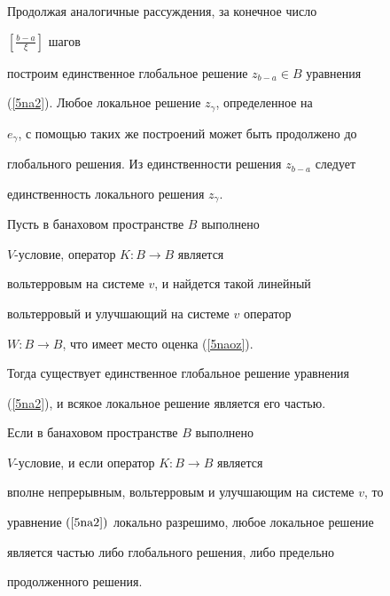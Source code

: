 Продолжая аналогичные рассуждения, за конечное число


$[\frac{b-a}{\xi}]$ шагов


построим единственное глобальное решение $z_{b-a} \in B$ уравнения


(\ref{5na2}). Любое локальное решение $z_\gamma$, определенное на


$e_\gamma$, с помощью таких же построений может быть продолжено до


глобального решения. Из единственности решения $z_{b-a}$ следует


единственность локального решения $z_\gamma$.








\begin{cornonum}


Пусть в банаховом пространстве $B$ выполнено


$V$-условие, оператор $K:B \to B$ является


вольтерровым на системе $v$, и найдется такой линейный


вольтерровый и улучшающий на системе $v$ оператор


$W:B \to B$, что имеет место оценка (\ref{5naoz}).


Тогда существует единственное глобальное решение уравнения


(\ref{5na2}), и всякое локальное решение является его частью.


\end{cornonum}








\begin{thm}


Если в банаховом пространстве $B$ выполнено


$V$-условие, и если оператор $K:B \to B$ является


вполне непрерывным, вольтерровым и улучшающим на системе $v$, то


уравнение $(\ref{5na2})$ локально разрешимо, любое локальное решение


является частью либо глобального решения, либо предельно


продолженного решения.


\end{thm}








